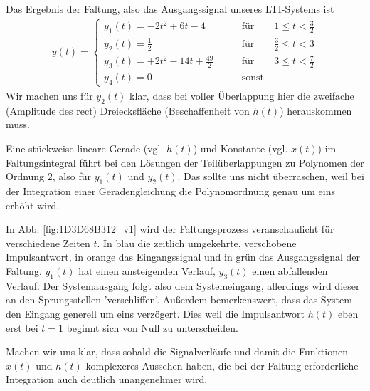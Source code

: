 \documentclass[11pt,a4paper,DIV=12]{scrartcl}
\numberwithin{equation}{section}
\numberwithin{figure}{section}
\newcommand{\fig}[1]{Abb. \ref{#1}} %
\begin{document}
\begin{Loesung}
Das Ergebnis der Faltung, also das Ausgangssignal unseres LTI-Systems ist
\begin{align}
y(t) =
\begin{cases}
  y_1(t) = -2 t^2 + 6 t - 4 &\qquad \mathrm{für} \qquad 1 \leq t < \frac{3}{2}\\
  y_2(t) = \frac{1}{2}  &\qquad \mathrm{für} \qquad \frac{3}{2} \leq t < 3\\
  y_3(t) = +2 t^2 - 14 t + \frac{49}{2} &\qquad \mathrm{für} \qquad 3 \leq t < \frac{7}{2}\\
  y_4(t)=0 &\qquad \mathrm{sonst}
\end{cases}
\end{align}
%
Wir machen uns für $y_2(t)$ klar, dass bei voller Überlappung hier die
zweifache (Amplitude des rect) Dreiecksfläche
(Beschaffenheit von $h(t)$) herauskommen muss.
%

Eine stückweise lineare Gerade (vgl. $h(t)$) und Konstante (vgl. $x(t)$)
im Faltungsintegral führt
bei den Lösungen der Teilüberlappungen zu Polynomen der Ordnung 2, also für
$y_1(t)$ und $y_2(t)$. Das sollte uns nicht überraschen,
weil bei der Integration einer Geradengleichung die Polynomordnung genau um eins
erhöht wird.
%

In \fig{fig:1D3D68B312_v1} wird der Faltungsprozess veranschaulicht für verschiedene
Zeiten $t$. In blau die zeitlich umgekehrte, verschobene Impulsantwort, in
orange das Eingangssignal und in grün das Ausgangssignal der Faltung.
%
$y_1(t)$ hat einen ansteigenden Verlauf, $y_3(t)$ einen abfallenden Verlauf.
Der Systemausgang folgt also dem Systemeingang, allerdings wird dieser an den
Sprungsstellen 'verschliffen'.
%
Außerdem bemerkenswert, dass das System den Eingang generell um eins verzögert.
Dies weil die Impulsantwort $h(t)$ eben erst bei $t=1$ beginnt sich von Null
zu unterscheiden.
%

Machen wir uns klar, dass sobald die Signalverläufe und damit die Funktionen
$x(t)$ und $h(t)$ komplexeres Aussehen haben, die bei der Faltung erforderliche
Integration auch deutlich unangenehmer wird.

\end{Loesung}
\end{document}
